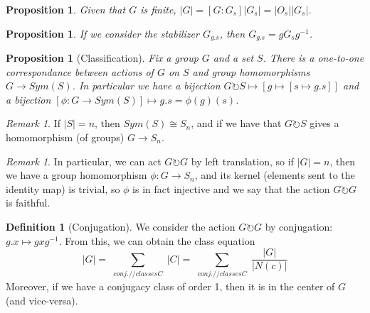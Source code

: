 \documentclass[12pt]{article}
\newtheorem{prop}[thm]{Proposition}
\theoremstyle{definition}
\newtheorem{defn}[thm]{Definition}
\theoremstyle{remark}
\newtheorem{rmk}[thm]{Remark}
\numberwithin{equation}{section}
\begin{document}
\begin{prop}
        Given that $G$ is finite, $|G| = [G:G_s]|G_s| = |O_s||G_s|$.
\end{prop}


\vspace{15pt}


\begin{prop}
        If we consider the stabilizer $G_{g.s}$, then $G_{g.s} = gG_sg^{-1}$.
\end{prop}

\vspace{15pt}


\begin{prop}[Classification]
        Fix a group $G$ and a set $S$. There is a one-to-one correspondance between actions of $G$ on $S$ and group homomorphisms $G \rightarrow Sym(S)$. In particular we have a bijection $G\circlearrowright S\mapsto [g\mapsto [s\mapsto g.s]]$ and a bijection $[\phi:G\rightarrow Sym(S)] \mapsto g.s = \phi(g)(s)$.
\end{prop}

\vspace{15pt}


\begin{rmk}
        If $|S| = n$, then $Sym(S) \cong S_n$, and if we have that $G\circlearrowright S$ gives a homomorphism (of groups) $G\rightarrow S_n$. 
\end{rmk}


\vspace{15pt}

\begin{rmk}
        In particular, we can act $G\circlearrowright G$ by left translation, so if $|G| = n$, then we have a group homomorphism $\phi:G\rightarrow S_n$, and its kernel (elements sent to the identity map) is trivial, so $\phi$ is in fact injective and we say that the action $G\circlearrowright G$ is faithful.
\end{rmk}


\vspace{15pt}

\begin{defn}[Conjugation]
        We consider the action $G\circlearrowright G$ by conjugation: $g.x\mapsto gxg^{-1}$. From this, we can obtain the class equation \begin{equation}
                |G| = \sum\limits_{\begin{array}{c} conj. // classes C\end{array}} |C| = \sum\limits_{\begin{array}{c} conj. // classes C\end{array}} \frac{|G|}{|N(c)|}
        \end{equation}
        Moreover, if we have a conjugacy class of order 1, then it is in the center of $G$ (and vice-versa).
\end{defn}
\end{document}
